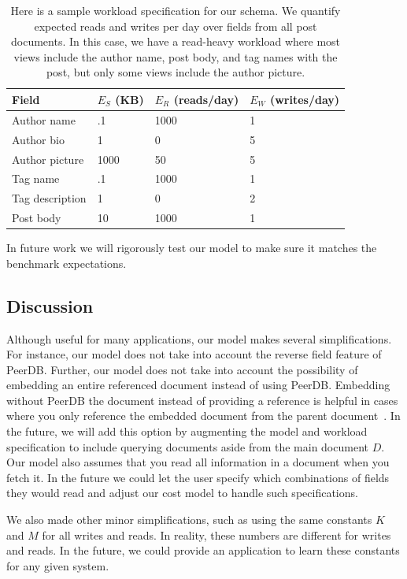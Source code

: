 \begin{table}
  \small
  \begin{center}
  \begin{tabular}{|l|l|l|l|}
    \hline
    Field & $E_S$ (KB) & $E_R$ (reads/day) & $E_W$ (writes/day)\\ \hline
    Author name & .1 & 1000 & 1 \\
    Author bio & 1 & 0 & 5 \\ 
    Author picture & 1000 & 50 & 5 \\ 
    Tag name & .1 & 1000 & 1 \\ 
    Tag description & 1 & 0 & 2 \\ 
    Post body & 10 & 1000 & 1 \\ \hline

  \end{tabular}
  \end{center}
  \caption{Here is a sample workload specification for our schema. We quantify expected reads and writes per day over fields from all post documents. In this case, we have a read-heavy workload where most views include the author name, post body, and tag names with the post, but only some views include the author picture.}
  \label{workload}
  \vspace{-4mm}
\end{table}

In future work we will rigorously test our model to make sure it matches the benchmark expectations. 

\subsection{Discussion}
Although useful for many applications, our model makes several simplifications. 
For instance, our model does not take into account the reverse field feature of PeerDB. 
Further, our model does not take into account the possibility of embedding an entire referenced document instead of using PeerDB. 
Embedding without PeerDB the document instead of providing a reference is helpful in cases where you only reference the embedded document from the parent document~\cite{MongoDB2014}. 
In the future, we will add this option by augmenting the model and workload specification to include querying documents aside from the main document $D$. 
Our model also assumes that you read all information in a document when you fetch it. 
In the future we could let the user specify which combinations of fields they would read and adjust our cost model to handle such specifications.

We also made other minor simplifications, such as using the same constants $K$ and $M$ for all writes and reads. 
In reality, these numbers are different for writes and reads. 
In the future, we could provide an application to learn these constants for any given system. 

